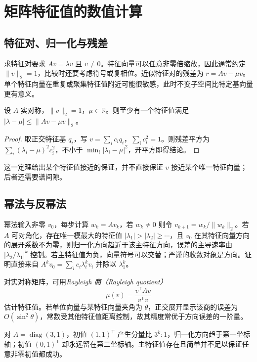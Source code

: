\setcounter{chapter}{6} %
\chapter{矩阵特征值的数值计算}
\label{chap:na-eigen}

\section{特征对、归一化与残差}
求特征对要求 $Av=\lambda v$ 且 $v\ne0$。特征向量可以任意非零倍缩放，因此通常约定 $\|v\|_2=1$，比较时还要考虑符号或复相位。近似特征对的残差为 $r=Av-\mu v$。单个特征向量在重复或聚集特征值附近可能很敏感，此时不变子空间比特定基向量更有意义。

\begin{proposition}[对称矩阵的残差界]
设 $A$ 实对称，$\|v\|_2=1$，$\mu\in\mathbb R$。则至少有一个特征值满足 $|\lambda-\mu|\le\|Av-\mu v\|_2$。
\end{proposition}
\begin{proof}
取正交特征基 $q_i$，写 $v=\sum_i c_iq_i$，$\sum_i c_i^2=1$。则残差平方为 $\sum_i(\lambda_i-\mu)^2c_i^2$，不小于 $\min_i|\lambda_i-\mu|^2$，开平方即得结论。
\end{proof}
这一定理给出某个特征值接近的保证，并不直接保证 $v$ 接近某个唯一特征向量；后者还需要谱间隙。

\section{幂法与反幂法}
幂法输入非零 $v_0$，每步计算 $w_k=Av_k$，若 $w_k\ne0$ 则令 $v_{k+1}=w_k/\|w_k\|_2$。若 $A$ 可对角化，存在唯一模最大的特征值 $|\lambda_1|>|\lambda_2|\ge\cdots$，且 $v_0$ 在其特征向量方向的展开系数不为零，则归一化方向趋近于该主特征方向，误差的主导速率由 $|\lambda_2/\lambda_1|^k$ 控制。若主特征值为负，向量符号可以交替；严谨的收敛对象是方向。证明直接来自 $A^kv_0=\sum_i c_i\lambda_i^kv_i$ 并除以 $\lambda_1^k$。

对实对称矩阵，可用\emph{Rayleigh 商（Rayleigh quotient）}
\[
 \mu(v)=\frac{v^{\mathsf T}Av}{v^{\mathsf T}v}
\]
估计特征值。若单位向量与某特征向量夹角为 $\theta$，正交展开显示该商的误差为 $O(\sin^2\theta)$，常数受其他特征值距离控制，故其精度常优于方向误差的一阶量。

\begin{example}[缺失主方向的初值]
对 $A=\operatorname{diag}(3,1)$，初值 $(1,1)^{\mathsf T}$ 产生分量比 $3^k:1$，归一化方向趋于第一坐标轴；初值 $(0,1)^{\mathsf T}$ 却永远留在第二坐标轴。主特征值存在且简单并不足以保证任意非零初值都成功。
\end{example}

